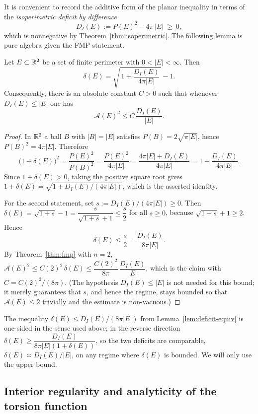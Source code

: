 It is convenient to record the additive form of the planar inequality in
terms of the \emph{isoperimetric deficit by difference}
\[
  D_I(E):=P(E)^2-4\pi\,|E|\ \ge\ 0 ,
\]
which is nonnegative by Theorem~\ref{thm:isoperimetric}. The following lemma
is pure algebra given the FMP statement.

\begin{lemma}[Equivalence of additive and multiplicative deficits, $n=2$]
\label{lem:deficit-equiv}
Let $E\subset\mathbb{R}^2$ be a set of finite perimeter with $0<|E|<\infty$. Then
\[
  \delta(E)=\sqrt{\,1+\frac{D_I(E)}{4\pi|E|}\,}-1 .
\]
Consequently, there is an absolute constant $C>0$ such that whenever
$D_I(E)\le |E|$ one has
\[
  \mathcal A(E)^2\le C\,\frac{D_I(E)}{|E|} .
\]
\end{lemma}

\begin{proof}
In $\mathbb{R}^2$ a ball $B$ with $|B|=|E|$ satisfies $P(B)=2\sqrt{\pi|E|}$, hence
$P(B)^2=4\pi|E|$. Therefore
\[
  \big(1+\delta(E)\big)^2=\frac{P(E)^2}{P(B)^2}
  =\frac{P(E)^2}{4\pi|E|}
  =\frac{4\pi|E|+D_I(E)}{4\pi|E|}
  =1+\frac{D_I(E)}{4\pi|E|} .
\]
Since $1+\delta(E)>0$, taking the positive square root gives
$1+\delta(E)=\sqrt{1+D_I(E)/(4\pi|E|)}$, which is the asserted identity.

For the second statement, set $s:=D_I(E)/(4\pi|E|)\ge 0$. Then
$\delta(E)=\sqrt{1+s}-1=\dfrac{s}{\sqrt{1+s}+1}\le \dfrac{s}{2}$ for all
$s\ge0$, because $\sqrt{1+s}+1\ge 2$. Hence
\[
  \delta(E)\le\frac{s}{2}=\frac{D_I(E)}{8\pi|E|} .
\]
By Theorem~\ref{thm:fmp} with $n=2$,
$\mathcal A(E)^2\le C(2)^2\,\delta(E)\le \dfrac{C(2)^2}{8\pi}\,
\dfrac{D_I(E)}{|E|}$, which is the claim with
$C=C(2)^2/(8\pi)$. (The hypothesis $D_I(E)\le|E|$ is not needed for this
bound; it merely guarantees that $s$, and hence the regime, stays bounded so
that $\mathcal A(E)\le 2$ trivially and the estimate is non-vacuous.)
\end{proof}

\begin{remark}\label{rem:deficit-comparison}
The inequality $\delta(E)\le D_I(E)/(8\pi|E|)$ from
Lemma~\ref{lem:deficit-equiv} is one-sided in the sense used above; in the
reverse direction $\delta(E)\ge \dfrac{D_I(E)}{8\pi|E|(1+\delta(E))}$, so the
two deficits are comparable, $\delta(E)\asymp D_I(E)/|E|$, on any regime where
$\delta(E)$ is bounded. We will only use the upper bound.
\end{remark}

\subsection{Interior regularity and analyticity of the torsion function}
\label{ss:torsion}


